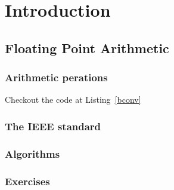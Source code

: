 \chapter{Introduction}\label{chp:introduction}

\section{Floating Point Arithmetic}\label{sec:floating-point-arithmetic}



\subsection{Arithmetic perations}

Checkout the code at Listing~\ref{bconv}

\subsection{The IEEE standard}

\subsection{Algorithms}

\subsection{Exercises}
